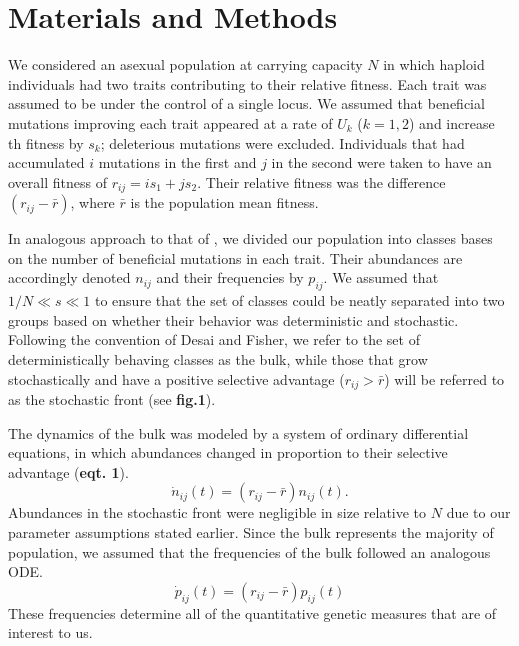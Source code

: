 \documentclass[9pt,twocolumn,twoside]{gsajnl}
\begin{document}
\section{Materials and Methods}
\label{sec:materials:methods}

We considered an asexual population at carrying capacity $N$ in which haploid individuals had two traits contributing to their relative fitness. Each trait was assumed to be under the control of a single locus. We assumed that beneficial mutations improving each trait appeared at a rate of $U_k$ ($k=1,2$) and increase th fitness by $s_k$; deleterious mutations were excluded. Individuals that had accumulated $i$ mutations in the first and $j$ in the second were taken to have an overall fitness of $r_{ij} = i s_1+j s_2$.  Their relative fitness was the difference $(r_{ij}-\bar{r})$, where  $\bar{r} $  is the population mean fitness. 

In analogous approach to that of \cite{desai2007beneficial}, we divided our population into classes bases on the number of beneficial mutations in each trait. Their abundances are accordingly denoted $n_{ij}$ and their frequencies by $p_{ij}$. We assumed that $1/N \ll s \ll 1$ to ensure that the set of classes could be neatly separated into two groups based on whether their behavior was deterministic and stochastic. Following the convention of Desai and Fisher, we refer to the set of deterministically behaving classes as the bulk, while those that grow stochastically and have a positive selective advantage ($r_{ij}>\bar{r}$) will be referred to as the stochastic front (see \textbf{fig.1}).\par

The dynamics of the bulk was modeled by a system of ordinary differential equations, in which abundances changed in proportion to their selective advantage (\textbf{eqt. 1}). 
\begin{equation} 
\dot{n}_{ij}(t) = (r_{ij}-\bar{r}) n_{ij}(t). 
\end{equation}
Abundances in the stochastic front were negligible in size relative to $N$ due to our parameter assumptions stated earlier.  Since the bulk represents the majority of population, we assumed that the frequencies of the bulk followed an analogous ODE.
\begin{equation} 
\dot{p}_{ij}(t) = (r_{ij}-\bar{r}) p_{ij}(t) 
\end{equation}
These frequencies determine all of the quantitative genetic measures that are of interest to us.\par 
\end{document}
